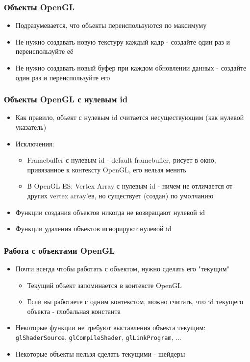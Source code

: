 \documentclass{beamer}
\begin{document}
\begin{frame}[fragile]
\frametitle{Объекты OpenGL}
\begin{itemize}
\item Подразумевается, что объекты переиспользуются по максимуму
\item Не нужно создавать новую текстуру каждый кадр - создайте один раз и переиспользуйте её
\item Не нужно создавать новый буфер при каждом обновлении данных - создайте один раз и переиспользуйте его
\end{itemize}
\end{frame}

\begin{frame}[fragile]
\frametitle{Объекты OpenGL с нулевым id}
\begin{itemize}
\item Как правило, объект с нулевым id считается несуществующим (как нулевой указатель)
\pause
\item Исключения:
\begin{itemize}
\item Framebuffer с нулевым id - default framebuffer, рисует в окно, привязанное к контексту OpenGL, его нельзя менять
\pause
\item В OpenGL ES: Vertex Array с нулевым id - ничем не отличается от других vertex array'ев, но существует (создан) по умолчанию
\end{itemize}
\pause
\item Функции создания объектов никогда не возвращают нулевой id
\item Функции удаления объектов игнорируют нулевой id
\end{itemize}
\end{frame}

\begin{frame}[fragile]
\frametitle{Работа с объектами OpenGL}
\begin{itemize}
\item Почти всегда чтобы работать с объектом, нужно сделать его "текущим"
\begin{itemize}
\item Текущий объект запоминается в контексте OpenGL
\item Если вы работаете с одним контекстом, можно считать, что id текущего объекта - глобальная константа
\end{itemize}
\pause
\item Некоторые функции не требуют выставления объекта текущим: \verb|glShaderSource|, \verb|glCompileShader|, \verb|glLinkProgram|, ...
\pause
\item Некоторые объекты нельзя сделать текущими - шейдеры
\end{itemize}
\end{frame}
\end{document}
